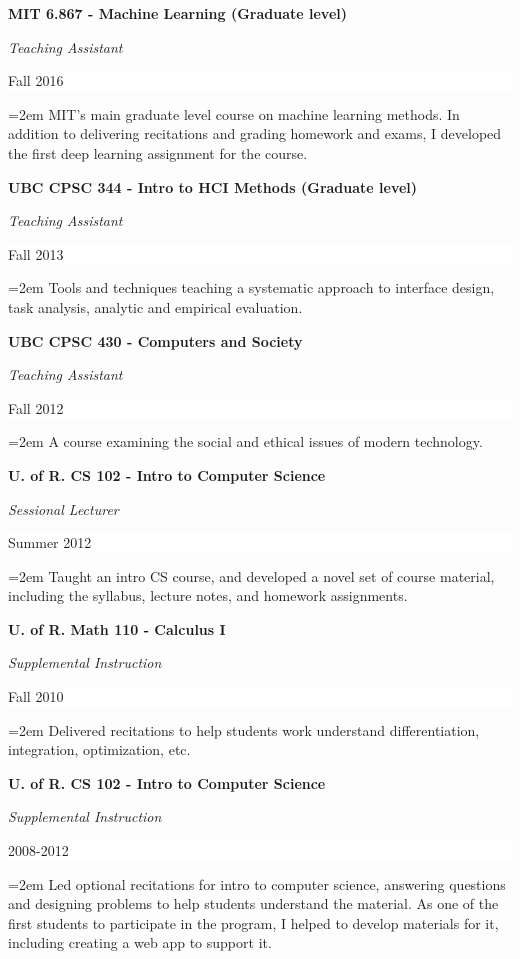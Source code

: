 \documentclass[paper=letter,fontsize=11pt]{scrartcl} %
\newcommand{\sepspace}{\vspace*{1em}}		%
\newcommand{\CourseEntry}[4]{
		\noindent \textbf{#1} \par
		\noindent \textit{#3} \hfill      %
		\colorbox{White}{%
			\parbox{6em}{%
			\hfill\color{Black}#2}} \par  %
		\noindent\hangindent=2em\hangafter=0 \small #4 %
		\normalsize \par}
\begin{document}
\CourseEntry{MIT 6.867 - Machine Learning (Graduate level)}{Fall 2016}{Teaching Assistant}
{MIT's main graduate level course on machine learning methods. In addition to delivering recitations and grading homework and exams, I developed the first deep learning assignment for the course.}
\sepspace

\CourseEntry{UBC CPSC 344 - Intro to HCI Methods (Graduate level)}{Fall 2013}{Teaching Assistant}
{Tools and techniques teaching a systematic approach to interface design, task analysis, analytic and empirical evaluation.}
\sepspace

\CourseEntry{UBC CPSC 430 - Computers and Society}{Fall 2012}{Teaching Assistant}
{A course examining the social and ethical issues of modern technology.}
\sepspace

\CourseEntry{U. of R. CS 102 - Intro to Computer Science}{Summer 2012}{Sessional Lecturer}
{Taught an intro CS course, and developed a novel set of course material, including the syllabus, lecture notes, and homework assignments.}
\sepspace

\CourseEntry{U. of R. Math 110 - Calculus I}{Fall 2010}{Supplemental Instruction}
{Delivered recitations to help students work understand differentiation, integration, optimization, etc.}
\sepspace

\CourseEntry{U. of R. CS 102 - Intro to Computer Science}{2008-2012}{Supplemental Instruction}
{Led optional recitations for intro to computer science, answering questions and designing problems to help students understand the material. As one of the first students to participate in the program, I helped to develop materials for it, including creating a web app to support it.}


\iffalse
MIT Machine Learning Across Disciplines Challenge

\fi
\end{document}
